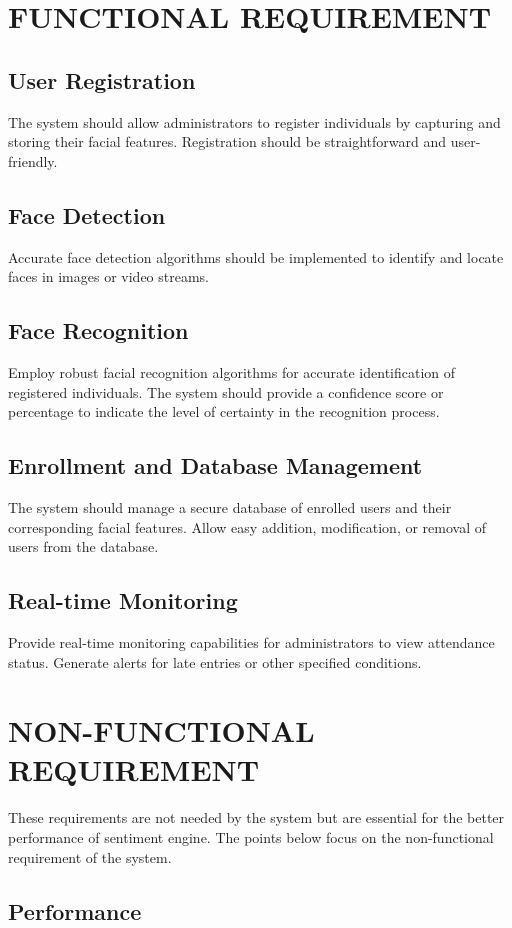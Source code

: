    \section{FUNCTIONAL REQUIREMENT}
           \subsection{User Registration}
The system should allow administrators to register individuals by capturing and storing their facial features.
Registration should be straightforward and user-friendly.
\subsection{Face Detection}
Accurate face detection algorithms should be implemented to identify and locate faces in images or video streams.
\subsection{Face Recognition}
Employ robust facial recognition algorithms for accurate identification of registered individuals.
The system should provide a confidence score or percentage to indicate the level of certainty in the recognition process.
\subsection{Enrollment and Database Management}
The system should manage a secure database of enrolled users and their corresponding facial features.
Allow easy addition, modification, or removal of users from the database.

\subsection{Real-time Monitoring}
Provide real-time monitoring capabilities for administrators to view attendance status.
Generate alerts for late entries or other specified conditions.

 \section{NON-FUNCTIONAL REQUIREMENT}
These requirements are not needed by the system but are essential for the better
performance of sentiment engine. The points below focus on the non-functional
requirement of the system.
           \subsection{Performance}
